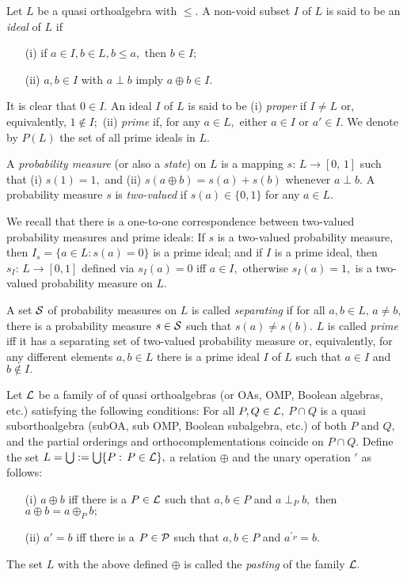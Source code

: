 Let $L$ be a quasi orthoalgebra with  $\le.$ A non-void
subset $I$
of $L$ is said to be an {\it ideal} of $L$ if
\begin{enumerate}
\item[{\rm (i)}] if $a \in I, b \in L, b \le a,$  then $ b \in I;$    \vspace{-2mm}
\item[{\rm (ii)}]      $a,b \in I$ with $ a\perp b$ imply $a \oplus b \in I.$
\end{enumerate}
It is clear that $0 \in I.$
An ideal $I$ of $L$ is said to be (i)
{\it proper} if $I \ne L$ or, equivalently, $1 \not\in I;$ (ii) {\it prime}
if, for any $a \in L,$ either $a \in I$ or $a' \in I.$ We denote
by $P(L)$ the set of all prime ideals in $L.$

A {\it probability measure} (or also a {\it state}) on $L$ is a mapping $s:\, L \to [0,\,1]$ such that
(i) $s(1) = 1,$ and (ii) $s(a\oplus b) = s(a) + s(b)$ whenever $a \perp b.$
A probability measure $s$ is {\it two-valued} if $s(a) \in \{0,1\}$ for any $a \in L.$

We recall that there is a one-to-one correspondence between two-valued
probability measures and prime ideals: If $s$ is a two-valued probability measure, then $I_s = \{a \in L:
s(a) = 0\}$ is a prime ideal; and if $I$ is a prime ideal, then
$s_I: \, L\to [0,1]$ defined via $s_I(a) = 0 $ iff $a \in I,$ otherwise
$s_I(a) = 1,$ is a two-valued probability measure on $L.$

A set $\cal S$ of probability measures on $L$ is called {\it separating}
if for all $a,b \in L,\, a \ne b, $ there is a probability measure $s \in {\cal {S}}$
such that $s(a) \ne s(b).$  $L$ is called {\it prime} iff it has a separating
set of two-valued probability measure or, equivalently, for any different elements
$a,b \in L$ there is a prime ideal $I$ of $L$ such that $a \in I$ and
$b \not\in I.$





Let $\cal L$ be a family of  of quasi orthoalgebras (or OAs, OMP, Boolean
algebras, etc.) satisfying the following conditions: For all
$P,Q \in {\cal{L}},$ $P\cap Q$ is a quasi suborthoalgebra (subOA, sub OMP,
Boolean subalgebra, etc.) of both $P$ and $Q,$ and the partial orderings
and orthocomplementations coincide on $P \cap Q.$ Define the set
$L = \bigcup := \bigcup\{P:\, P \in {\cal{L}}\},$ a relation $\oplus $
and the unary operation $'$ as follows:
\begin{enumerate}
\item[{\rm (i)}]  $a \oplus b$ iff there is a $P \in {\cal {L}}$ such  that
$a,b \in P$ and $a \perp_P b,$ then $a \oplus b = a \oplus_P b;$  \vspace{-2mm}
\item[{\rm (ii)}]  $a'=b$ iff there is a $P \in  {\cal {P}}$ such that
$a,b \in P$ and $a^{'_P} = b.$
\end{enumerate}
The set $L$ with the above defined $\oplus$ is called the {\it pasting}
of the family $\cal L.$

